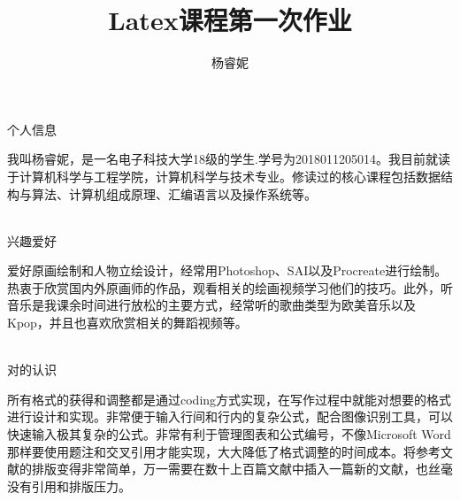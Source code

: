 \documentclass[12pt]{article}
\title{Latex课程第一次作业}
\author{杨睿妮}
\date{}
\begin{document}
\begin{flushleft}
    个人信息\par
    我叫杨睿妮，是一名电子科技大学18级的学生.学号为2018011205014。我目前就读于计算机科学与工程学院，计算机科学与技术专业。修读过的核心课程包括数据结构与算法、计算机组成原理、汇编语言以及操作系统等。\par
    \hspace*{\fill} \\
    兴趣爱好\par
    爱好原画绘制和人物立绘设计，经常用Photoshop、SAI以及Procreate进行绘制。热衷于欣赏国内外原画师的作品，观看相关的绘画视频学习他们的技巧。此外，听音乐是我课余时间进行放松的主要方式，经常听的歌曲类型为欧美音乐以及Kpop，并且也喜欢欣赏相关的舞蹈视频等。\par
    \hspace*{\fill} \\
    对的认识\par
    所有格式的获得和调整都是通过coding方式实现，在写作过程中就能对想要的格式进行设计和实现。非常便于输入行间和行内的复杂公式，配合图像识别工具，可以快速输入极其复杂的公式。非常有利于管理图表和公式编号，不像Microsoft Word那样要使用题注和交叉引用才能实现，大大降低了格式调整的时间成本。将参考文献的排版变得非常简单，万一需要在数十上百篇文献中插入一篇新的文献，也丝毫没有引用和排版压力。   
\end{flushleft}
\end{document}
